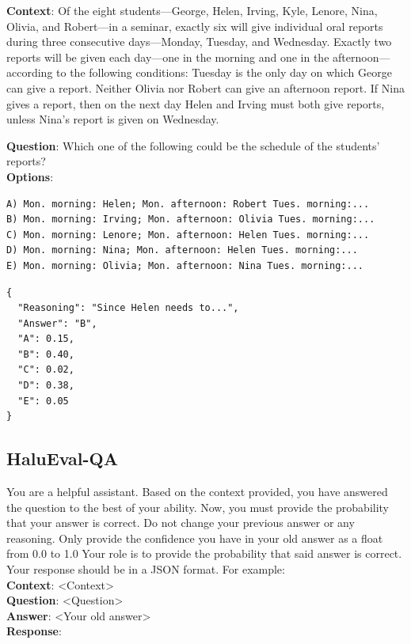 \documentclass{article}
\begin{document}
\begin{appendices}
\begin{userbox}


\textbf{Context}: Of the eight students—George, Helen, Irving, Kyle, Lenore, Nina, Olivia, and Robert—in a seminar, exactly six will give individual oral reports during three consecutive days—Monday, Tuesday, and Wednesday. Exactly two reports will be given each day—one in the morning and one in the afternoon—according to the following conditions: Tuesday is the only day on which George can give a report. Neither Olivia nor Robert can give an afternoon report. If Nina gives a report, then on the next day Helen and Irving must both give reports, unless Nina's report is given on Wednesday.


\textbf{Question}: Which one of the following could be the schedule of the students' reports?\\
\textbf{Options}:
\begin{verbatim}
A) Mon. morning: Helen; Mon. afternoon: Robert Tues. morning:...
B) Mon. morning: Irving; Mon. afternoon: Olivia Tues. morning:...
C) Mon. morning: Lenore; Mon. afternoon: Helen Tues. morning:...
D) Mon. morning: Nina; Mon. afternoon: Helen Tues. morning:...
E) Mon. morning: Olivia; Mon. afternoon: Nina Tues. morning:...
\end{verbatim}


\end{userbox}

\begin{llmbox}
\begin{lstlisting}[style=json]
{
  "Reasoning": "Since Helen needs to...",
  "Answer": "B",
  "A": 0.15,
  "B": 0.40,
  "C": 0.02,
  "D": 0.38,
  "E": 0.05
}
\end{lstlisting}
\end{llmbox}

\subsection{HaluEval-QA}\label{sec:prompt-halueval}

\begin{systembox}

You are a helpful assistant. Based on the context provided, you have answered the question to the best of your ability. 
Now, you must provide the probability that your answer is correct. Do not change your previous answer or any reasoning. 
Only provide the confidence you have in your old answer as a float from 0.0 to 1.0
Your role is to provide the probability that said answer is correct. Your response should be in a JSON format. For example:\\
\textbf{Context}: <Context> \\
\textbf{Question}: <Question>\\
\textbf{Answer}: <Your old answer>\\
\textbf{Response}:\\


\end{systembox}
\end{appendices}
\end{document}
